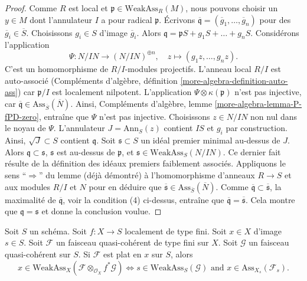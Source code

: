 \begin{proof}
\medskip\noindent
Comme $R$ est local et $\mathfrak p \in \text{WeakAss}_R(M)$,
nous pouvons choisir un $y \in M$ dont l'annulateur $I$ a pour radical
$\mathfrak p$.
Écrivons $\overline{\mathfrak q} = (\overline{g}_1, \ldots, \overline{g}_n)$
pour des $\overline{g}_i \in \overline{S}$. Choisissons $g_i \in S$
d'image $\overline{g}_i$.
Alors $\mathfrak q = \mathfrak pS + g_1S + \ldots + g_nS$.
Considérons l'application
$$
\Psi : N/IN \longrightarrow (N/IN)^{\oplus n}, \quad
z \longmapsto (g_1z, \ldots, g_nz).
$$
C'est un homomorphisme de $R/I$-modules projectifs.
L'anneau local $R/I$ est auto-associé
(Compléments d'algèbre, définition \ref{more-algebra-definition-auto-ass})
car $\mathfrak p/I$ est localement nilpotent.
L'application $\Psi \otimes \kappa(\mathfrak p)$ n'est pas injective, car
$\overline{\mathfrak q} \in \text{Ass}_{\overline{S}}(\overline{N})$.
Ainsi, Compléments d'algèbre, lemme \ref{more-algebra-lemma-P-fPD-zero},
entraîne que $\Psi$ n'est pas injective. Choisissons $z \in N/IN$
non nul dans le noyau de $\Psi$. L'annulateur $J = \text{Ann}_S(z)$
contient $IS$ et $g_i$ par construction. Ainsi,
$\sqrt{J} \subset S$ contient $\mathfrak q$.
Soit $\mathfrak s \subset S$ un idéal premier minimal au-dessus de $J$.
Alors $\mathfrak q \subset \mathfrak s$,
$\mathfrak s$ est au-dessus de $\mathfrak p$, et
$\mathfrak s \in \text{WeakAss}_S(N/IN)$.
Ce dernier fait résulte de la définition des idéaux premiers faiblement associés.
Appliquons le sens ``$\Rightarrow$'' du lemme (déjà démontré)
à l'homomorphisme d'anneaux $R \to S$ et aux modules $R/I$ et $N$
pour en déduire que
$\overline{\mathfrak s} \in \text{Ass}_{\overline{S}}(\overline{N})$.
Comme $\overline{\mathfrak q} \subset \overline{\mathfrak s}$,
la maximalité de $\overline{\mathfrak q}$, voir la condition (4) ci-dessus,
entraîne que $\overline{\mathfrak q} = \overline{\mathfrak s}$.
Cela montre que $\mathfrak q = \mathfrak s$ et donne
la conclusion voulue.
\end{proof}

\begin{lemma}
\label{lemma-bourbaki-finite-type-general-base-at-point}
Soit $S$ un schéma.
Soit $f : X \to S$ localement de type fini.
Soit $x \in X$ d'image $s \in S$.
Soit $\mathcal{F}$ un faisceau quasi-cohérent de type fini sur $X$.
Soit $\mathcal{G}$ un faisceau quasi-cohérent sur $S$.
Si $\mathcal{F}$ est plat en $x$ sur $S$, alors
$$
x \in \text{WeakAss}_X(\mathcal{F} \otimes_{\mathcal{O}_X} f^*\mathcal{G})
\Leftrightarrow
s \in \text{WeakAss}_S(\mathcal{G})
\text{ and }
x \in \text{Ass}_{X_s}(\mathcal{F}_s).
$$
\end{lemma}

